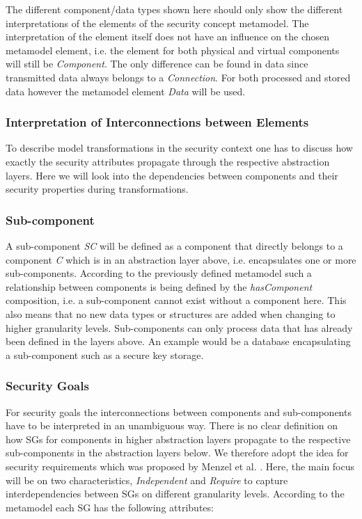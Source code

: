 The different component/data types shown here should only show the different interpretations of the elements of the security concept metamodel. The interpretation of the element itself does not have an influence on the chosen metamodel element, i.e. the element for both physical and virtual components will still be \textit{Component}. The only difference can be found in data since transmitted data always belongs to a \textit{Connection}. For both processed and stored data however the metamodel element \textit{Data} will be used.

\subsubsection{Interpretation of Interconnections between Elements}

To describe model transformations in the security context one has to discuss how exactly the security attributes propagate through the respective abstraction layers. Here we will look into the dependencies between components and their security properties during transformations.

\subsubsection*{Sub-component}
\label{subsubsec:sub_comp}
A sub-component \textit{SC} will be defined as a component that directly belongs to a component \textit{C} which is in an abstraction layer above, i.e. encapsulates one or more sub-components. According to the previously defined metamodel such a relationship between components is being defined by the \textit{hasComponent} composition, i.e. a sub-component cannot exist without a component here. This also means that no new data types or structures are added when changing to higher granularity levels. Sub-components can only process data that has already been defined in the layers above. An example would be a database encapsulating a sub-component such as a secure key storage.   

\subsubsection*{Security Goals}

For security goals the interconnections between components and sub-components have to be interpreted in an unambiguous way. There is no clear definition on how SGs for components in higher abstraction layers propagate to the respective sub-components in the abstraction layers below. We therefore adopt the idea for security requirements which was proposed by Menzel et al. \cite{Menzel2008}. Here, the main focus will be on two characteristics, \textit{Independent} and \textit{Require} to capture interdependencies between SGs on different granularity levels. According to the metamodel each SG has the following attributes:


